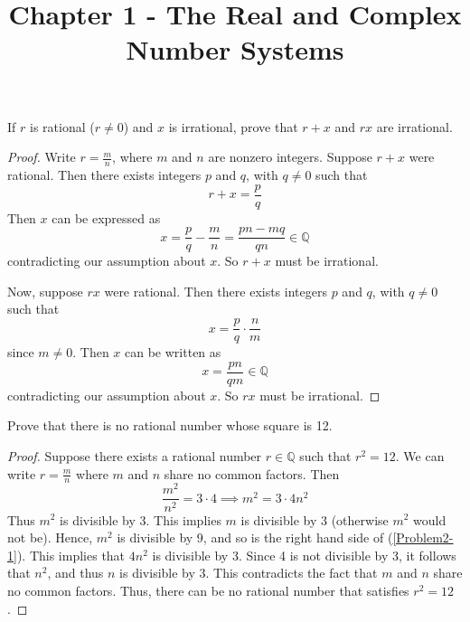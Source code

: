 \documentclass[12pt]{article}
\newenvironment{problem}[2][Problem]{\begin{trivlist}
\item[\hskip \labelsep {\bfseries #1}\hskip \labelsep {\bfseries #2.}]}{\end{trivlist}}
\begin{document}
 
 
\title{Chapter 1 - The Real and Complex Number Systems}
\date{}
\maketitle
 
\begin{problem}{1}
If $r$ is rational ($r\neq 0$) and $x$ is irrational, prove that $r+x$ and $rx$ are irrational.
\end{problem}
 
\begin{proof}
Write $r = \frac{m}{n}$, where $m$ and $n$ are nonzero integers.  Suppose $r+x$ were rational.  Then there exists integers $p$ and $q$, with $q\neq 0$ such that
\begin{equation}
r + x = \frac{p}{q}
\end{equation}
Then $x$ can be expressed as
\begin{equation}
x = \frac{p}{q} - \frac{m}{n} = \frac{pn - mq}{qn} \in \mathbb{Q}
\end{equation}
contradicting our assumption about $x$.  So $r+x$ must be irrational.

\vspace{2mm}

Now, suppose $rx$ were rational.  Then there exists integers $p$ and $q$, with $q\neq0$ such that
\begin{equation}
x = \frac{p}{q}\cdot\frac{n}{m}
\end{equation}
since $m\neq 0$.  Then $x$ can be written as
\begin{equation}
x = \frac{pn}{qm} \in \mathbb{Q}
\end{equation}
contradicting our assumption about $x$.  So $rx$ must be irrational.
\end{proof}

\begin{problem}{2}
Prove that there is no rational number whose square is 12.
\end{problem}
\begin{proof}
Suppose there exists a rational number $r \in \mathbb{Q}$ such that $r^2 = 12$.  We can write $r = \frac{m}{n}$ where $m$ and $n$ share no common factors.  Then
\begin{equation}\label{Problem2-1}
\frac{m^2}{n^2} = 3\cdot 4 \implies m^2 = 3\cdot 4n^2
\end{equation}
Thus $m^2$ is divisible by 3.  This implies $m$ is divisible by 3 (otherwise $m^2$ would not be).  Hence, $m^2$ is divisible by 9, and so is the right hand side of (\ref{Problem2-1}).  This implies that $4n^2$ is divisible by 3.  Since 4 is not divisible by 3, it follows that $n^2$, and thus $n$ is divisible by 3.  This contradicts the fact that $m$ and $n$ share no common factors.  Thus, there can be no rational number that satisfies $r^2 = 12$.
\end{proof}
\end{document}
